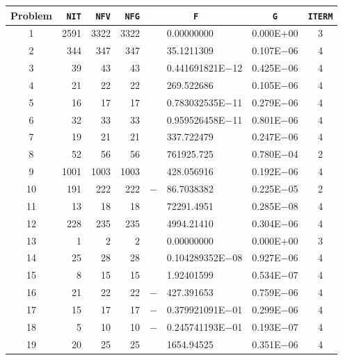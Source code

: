 \documentclass{esub2acm}
\begin{document}
\begin{table}
\footnotesize
\centering
\begin{tabular}{c|rrrr@{}lcc} \hline
Problem\rule[-2pt]{0pt}{12pt} & {\tt NIT} & {\tt NFV} & {\tt NFG} & \multicolumn{2}{c}{\tt F} & {\tt G} & {\tt ITERM} \\ \hline
1\rule[-2pt]{0pt}{12pt} &   2591    &   3322    &   3322    &       &   0.00000000  &   0.000E+00   &   3   \\
2   &   344 &   347 &   347 &       &   35.1211309  &   0.107E$-$06 &   4   \\
3   &   39  &   43  &   43  &       &   0.441691821E$-$12   &   0.425E$-$06 &   4   \\
4   &   21  &   22  &   22  &       &   269.522686  &   0.105E$-$06 &   4   \\
5   &   16  &   17  &   17  &       &   0.783032535E$-$11   &   0.279E$-$06 &   4   \\
6   &   32  &   33  &   33  &       &   0.959526458E$-$11   &   0.801E$-$06 &   4   \\
7   &   19  &   21  &   21  &       &   337.722479  &   0.247E$-$06 &   4   \\
8   &   52  &   56  &   56  &       &   761925.725  &   0.780E$-$04 &   2   \\
9   &   1001    &   1003    &   1003    &       &   428.056916  &   0.192E$-$06 &   4   \\
10  &   191 &   222 &   222 &   $-$ &   86.7038382  &   0.225E$-$05 &   2   \\
11  &   13  &   18  &   18  &       &   72291.4951  &   0.285E$-$08 &   4   \\
12  &   228 &   235 &   235 &       &   4994.21410  &   0.304E$-$06 &   4   \\
13  &   1   &   2   &   2   &       &   0.00000000  &   0.000E+00   &   3   \\
14  &   25  &   28  &   28  &       &   0.104289352E$-$08   &   0.927E$-$06 &   4   \\
15  &   8   &   15  &   15  &       &   1.92401599  &   0.534E$-$07 &   4   \\
16  &   21  &   22  &   22  &   $-$ &   427.391653  &   0.759E$-$06 &   4   \\
17  &   15  &   17  &   17  &   $-$ &   0.379921091E$-$01   &   0.299E$-$06 &   4   \\
18  &   5   &   10  &   10  &   $-$ &   0.245741193E$-$01   &   0.193E$-$07 &   4   \\
19  &   20  &   25  &   25  &       &   1654.94525  &   0.351E$-$06 &   4   \\

\end{tabular}
\end{table}
\end{document}
